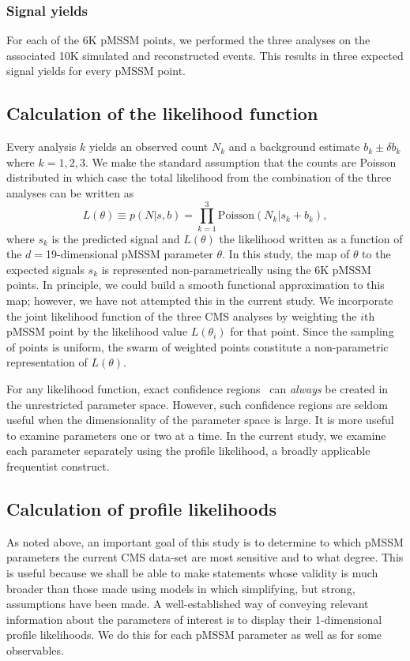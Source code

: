 \subsubsection{Signal yields}
\label{sec:sigyield}

For each of the 6K pMSSM points, we performed the three analyses on the associated 10K simulated and reconstructed events. This results in three expected signal yields for every pMSSM point. 


\subsection{Calculation of the likelihood function}

Every analysis $k$ yields an observed count $N_k$ and a background estimate
$b_k \pm \delta b_k$ where $k=1,2,3$.  We make the standard assumption that the
counts are Poisson distributed in which case the total likelihood from the combination of the three analyses can be written as
\begin{equation}
L(\theta) \equiv p(N|s,b) = \prod_{k=1}^3 \mbox{Poisson}(N_k | s_k + b_k),
\end{equation}
where $s_k$ is the predicted signal and $L(\theta)$ the likelihood
written as a function of the  $d = $19-dimensional pMSSM parameter $\theta$. 
In this study, the
 map of $\theta$ to the expected signals $s_k$ is represented non-parametrically
 using the 6K pMSSM points. In principle, we could build a smooth functional approximation to
 this map; however, we have not attempted this in the current study. 
 We incorporate the joint likelihood function of the three CMS analyses by
 weighting the $i$th pMSSM point by the likelihood 
 value $L(\theta_i)$ for that point. Since the sampling of points is uniform, the swarm of weighted
 points constitute a non-parametric representation of $L(\theta)$.
 
 For any likelihood function, exact confidence regions~\cite{James}  can \emph{always} 
 be created in
 the unrestricted parameter space. However, such
 confidence regions are seldom useful when the dimensionality of the 
 parameter space is large. It is 
 more useful to examine parameters one or two at a time. In the current study,
 we examine each parameter separately using the profile likelihood, a broadly applicable frequentist
 construct.

\subsection{Calculation of profile likelihoods}
As noted above, an important goal of this study is to determine to which pMSSM parameters the current  CMS data-set are most sensitive and to what degree. This is useful because we shall
be able to make statements whose validity is much broader than those made using
models in which simplifying, but strong, assumptions have been made.  A well-established way of conveying relevant information about the parameters of interest
 is to display their 1-dimensional profile likelihoods. We do this for each pMSSM parameter
as well as for some observables.

